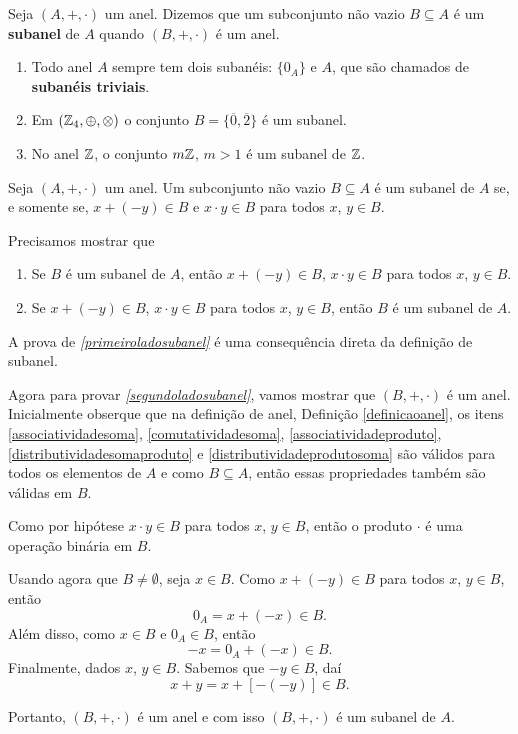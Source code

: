 \begin{definicao}
    Seja $(A, +, \cdot)$ um anel. Dizemos que um subconjunto não vazio $B\subseteq A$ é um \textbf{subanel} de $A$ quando $(B, +, \cdot)$ é um anel.
\end{definicao}

\begin{exemplos}
    \begin{enumerate}[label={\arabic*})]
        \item Todo anel $A$ sempre tem dois subanéis: $\{0_{A}\}$ e $A$, que são chamados de \textbf{subanéis triviais}.
        \item Em $(\mathbb{Z}_4,\oplus,\otimes)$ o conjunto $B = \{\overline{0}, \overline{2}\}$ é um subanel.
        \item No anel $\mathbb{Z}$, o conjunto $m\mathbb{Z}$, $m > 1$ é um subanel de $\mathbb{Z}$.
    \end{enumerate}
\end{exemplos}

\begin{proposicao}\label{proposicao_subanel}
    Seja $(A, +,\cdot)$ um anel. Um subconjunto não vazio $B\subseteq A$ é um subanel de $A$ se, e somente se, $x + (-y) \in B$ e $x\cdot y \in B$ para todos $x$, $y \in
    B$.
\end{proposicao}
\begin{prova}
    Precisamos mostrar que
    \begin{enumerate}[label={\roman*})]
        \item Se $B$ é um subanel de $A$, então $x + (-y) \in B$, $x\cdot y \in B$ para todos $x$, $y \in B$.\label{primeiroladosubanel}

        \item Se $x + (-y) \in B$, $x\cdot y \in B$ para todos $x$, $y \in B$, então $B$ é um subanel de $A$.\label{segundoladosubanel}
    \end{enumerate}

    A prova de \textit{\ref{primeiroladosubanel}} é uma consequência direta da definição de subanel.

    Agora para provar \textit{\ref{segundoladosubanel}}, vamos mostrar que $(B, +, \cdot)$ é um anel. Inicialmente obserque que na definição de anel, Definição
    \ref{definicaoanel}, os itens \ref{associatividadesoma}, \ref{comutatividadesoma}, \ref{associatividadeproduto}, \ref{distributividadesomaproduto} e
    \ref{distributividadeprodutosoma} são válidos para todos os elementos de $A$ e como $B \subseteq A$, então essas propriedades também são válidas em $B$.

    Como por hipótese $x\cdot y \in B$ para todos $x$, $y \in B$, então o produto $\cdot$ é uma operação binária em $B$.

    Usando agora que $B \ne \emptyset$, seja $x \in B$. Como $x + (-y) \in B$ para todos $x$, $y \in B$, então
    \[
        0_A = x + (-x) \in B.
    \]
    Além disso, como $x \in B$ e $0_A \in B$, então
    \[
        -x = 0_A + (-x) \in B.
    \]
    Finalmente, dados $x$, $y \in B$. Sabemos que $-y \in B$, daí
    \[
        x + y = x + [-(-y)] \in B.
    \]

    Portanto, $(B, +, \cdot)$ é um anel e com isso $(B, +, \cdot)$ é um subanel de $A$.
\end{prova}

